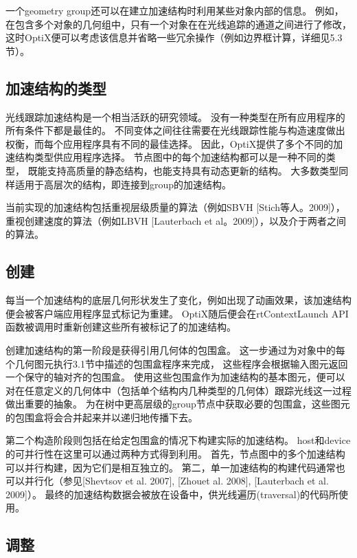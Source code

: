 一个geometry group还可以在建立加速结构时利用某些对象内部的信息。
例如，在包含多个对象的几何组中，只有一个对象在在光线追踪的通道之间进行了修改， 
这时OptiX便可以考虑该信息并省略一些冗余操作（例如边界框计算，详细见5.3节）。

\subsection{加速结构的类型}

光线跟踪加速结构是一个相当活跃的研究领域。
没有一种类型在所有应用程序的所有条件下都是最佳的。
不同变体之间往往需要在光线跟踪性能与构造速度做出权衡，而每个应用程序具有不同的最佳选择。
因此，OptiX提供了多个不同的加速结构类型供应用程序选择。
节点图中的每个加速结构都可以是一种不同的类型，
既能支持高质量的静态结构，也能支持具有动态更新的结构。
大多数类型同样适用于高层次的结构，即连接到group的加速结构。

当前实现的加速结构包括重视层级质量的算法（例如SBVH [Stich等人。2009]），
重视创建速度的算法（例如LBVH [Lauterbach et al。2009]），以及介于两者之间的算法。

\subsection{创建}

每当一个加速结构的底层几何形状发生了变化，例如出现了动画效果，该加速结构便会被客户端应用程序显式标记为重建。
OptiX随后便会在rtContextLaunch API函数被调用时重新创建这些所有被标记了的加速结构。

创建加速结构的第一阶段是获得引用几何体的包围盒。
这一步通过为对象中的每个几何图元执行3.1节中描述的包围盒程序来完成，
这些程序会根据输入图元返回一个保守的轴对齐的包围盒。
使用这些包围盒作为加速结构的基本图元，便可以对在任意定义的几何体中（包括单个结构内几种类型的几何体）跟踪光线这一过程做出重要的抽象。
为在树中更高层级的group节点中获取必要的包围盒，这些图元的包围盒将会合并起来并以递归地传播下去。

第二个构造阶段则包括在给定包围盒的情况下构建实际的加速结构。
host和device的可并行性在这里可以通过两种方式得到利用。
首先，节点图中的多个加速结构可以并行构建，因为它们是相互独立的。
第二，单一加速结构的构建代码通常也可以并行化（参见[Shevtsov et al. 2007], [Zhouet al. 2008], [Lauterbach et al. 2009]）。
最终的加速结构数据会被放在设备中，供光线遍历(traversal)的代码所使用。

\subsection{调整}

